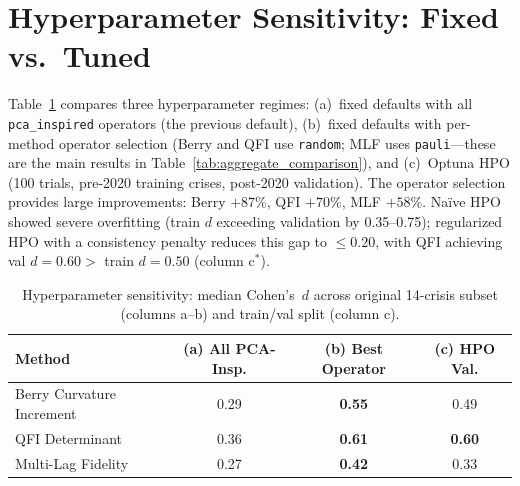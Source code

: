 \documentclass[3p]{elsarticle}
\begin{document}
\section{Hyperparameter Sensitivity: Fixed vs.\ Tuned}\label{sec:fixed_hp_ablation}

Table~\ref{tab:fixed_hp} compares three hyperparameter regimes:
(a)~fixed defaults with all \texttt{pca\_inspired} operators
(the previous default),
(b)~fixed defaults with per-method operator selection (Berry and
QFI use \texttt{random}; MLF uses \texttt{pauli}---these are
the main results in Table~\ref{tab:aggregate_comparison}), and (c)~Optuna
HPO (100 trials, pre-2020 training crises, post-2020 validation).
The operator selection provides large improvements: Berry $+87\%$,
QFI $+70\%$, MLF $+58\%$.
Na\"ive HPO showed
severe overfitting (train $d$ exceeding validation by 0.35--0.75);
regularized HPO with a consistency penalty reduces this gap to
$\leq 0.20$, with QFI achieving val $d = 0.60 >$ train $d = 0.50$
(column c$^*$).

\begin{table}[htb]
\centering
\caption{Hyperparameter sensitivity: median Cohen's~$d$ across
  original 14-crisis subset (columns a--b) and train/val split (column c).}
\label{tab:fixed_hp}
\small
\begin{tabular}{lccc}
\toprule
Method & (a) All PCA-Insp. & (b) Best Operator & (c) HPO Val. \\
\midrule
Berry Curvature Increment & 0.29 & \textbf{0.55} & 0.49 \\
QFI Determinant           & 0.36 & \textbf{0.61} & \textbf{0.60} \\
Multi-Lag Fidelity        & 0.27 & \textbf{0.42} & 0.33 \\
\bottomrule
\end{tabular}

\medskip
{}
\end{table}
\end{document}
